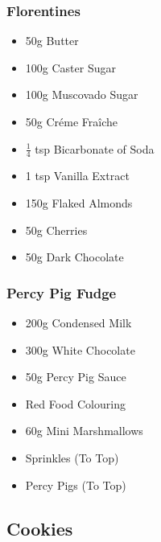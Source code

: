 \documentclass[11pt, english]{article}
\begin{document}
		\subsubsection*{Florentines}

	\begin{itemize}
        \setlength\itemsep{0cm}
                \item 50g Butter
		\item 100g Caster Sugar
		\item 100g Muscovado Sugar
		\item 50g Cr\'{e}me Fra\^{i}che
		\item $\frac{1}{4}$ tsp Bicarbonate of Soda
		\item 1 tsp Vanilla Extract
		\item 150g Flaked Almonds
		\item 50g Cherries
		\item 50g Dark Chocolate
        \end{itemize}

		\subsubsection*{Percy Pig Fudge}

	\begin{itemize}
        \setlength\itemsep{0cm}
                \item 200g Condensed Milk
		\item 300g White Chocolate
		\item 50g Percy Pig Sauce
		\item Red Food Colouring
		\item 60g Mini Marshmallows
		\item Sprinkles (To Top)
		\item Percy Pigs (To Top)
        \end{itemize}

\newpage

	\subsection{Cookies}
\end{document}
